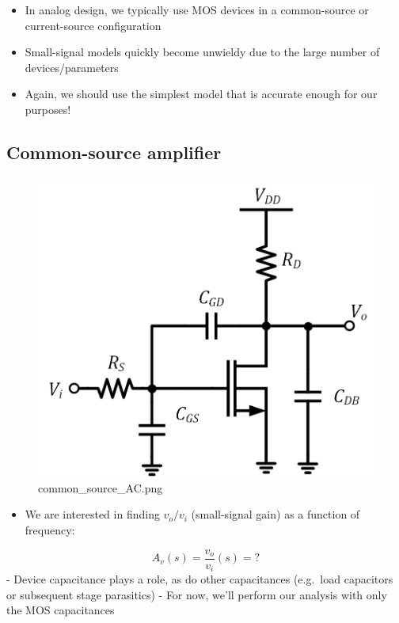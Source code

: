 \documentclass[11pt]{article}
\providecommand{\tightlist}{%
      \setlength{\itemsep}{0pt}\setlength{\parskip}{0pt}}
\begin{document}
    \begin{itemize}
\tightlist
\item
  In analog design, we typically use MOS devices in a common-source or
  current-source configuration
\item
  Small-signal models quickly become unwieldy due to the large number of
  devices/parameters
\item
  Again, we should use the simplest model that is accurate enough for
  our purposes!
\end{itemize}

    \hypertarget{common-source-amplifier}{%
\subsection{Common-source amplifier}\label{common-source-amplifier}}

    \begin{figure}
\centering
\includegraphics{common_source_AC.png}
\caption{common\_source\_AC.png}
\end{figure}

    \begin{itemize}
\tightlist
\item
  We are interested in finding \(v_o/v_i\) (small-signal gain) as a
  function of frequency:
\end{itemize}

\begin{equation}
A_v(s) =\dfrac{v_o}{v_i}(s) = ?
\end{equation} - Device capacitance plays a role, as do other
capacitances (e.g.~load capacitors or subsequent stage parasitics) - For
now, we'll perform our analysis with only the MOS capacitances
\end{document}
